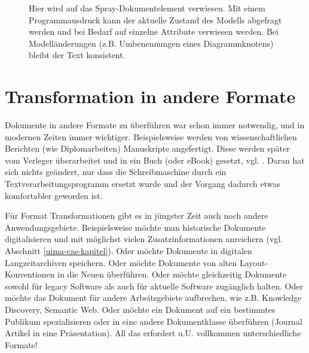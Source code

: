  
\begin{figure}[h!]
\centering
\advance\leftskip-2.5cm
\caption{ Hier wird auf das Spray-Dokumentelement verwiesen. Mit einem Programmausdruck kann der aktuelle Zustand des Modells abgefragt werden und bei Bedarf auf einzelne Attribute verwiesen werden. Bei Modelländerungen (z.B. Umbenennungen eines Diagrammknotens) bleibt der Text konsistent. }\label{sprayreferenzieren}
\end{figure}
 
\section{Transformation in andere Formate}\label{transformation}
 
Dokumente in andere Formate zu überführen war schon immer notwendig, und in modernen Zeiten immer wichtiger. Beispielsweise werden von wissenschaftlichen Berichten (wie Diplomarbeiten) Manuskripte angefertigt. Diese werden später vom Verleger überarbeitet und in ein Buch (oder eBook) gesetzt, vgl. \citep{DIN1422-1}. Daran hat sich nichts geändert, nur dass die Schreibmaschine durch ein Textverarbeitungsprogramm ersetzt wurde und der Vorgang dadurch etwas komfortabler geworden ist.

 
Für Format Transformationen gibt es in jüngster Zeit auch noch andere Anwendungsgebiete. Beispielsweise möchte man historische Dokumente digitalisieren und mit möglichst vielen Zusatzinformationen anreichern (vgl. Abschnitt \ref{uima-cas-kapitel}). Oder möchte Dokumente in digitalen Langzeitarchiven speichern. Oder möchte Dokumente von alten Layout-Konventionen in die Neuen überführen. Oder möchte gleichzeitig Dokumente sowohl für legacy Software als auch für aktuelle Software zugänglich halten. Oder möchte das Dokument für andere Arbeitsgebiete aufbrechen, wie z.B. Knowledge Discovery, Semantic Web. Oder möchte ein Dokument auf ein bestimmtes Publikum spezialisieren oder in eine andere Dokumentklasse überführen (Journal Artikel in eine Präsentation). All das erfordert u.U. vollkommen unterschiedliche Formate!


